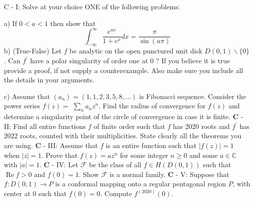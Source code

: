 \documentclass[14pt]{extarticle}
\begin{document}
\newpage
C - I: Solve at your choice ONE of the following problems:

a) If $0<a<1$ then show that
$$
\int_{-\infty}^{\infty} \frac{e^{a x}}{1+e^{x}} d x=\frac{\pi}{\sin (a \pi)}
$$
b) (True-False) Let $f$ be analytic on the open punctured unit disk $D(0,1) \backslash\{0\}$. Can $f^{\prime}$ have a polar singularity of order one at 0 ? If you believe it is true provide a proof, if not supply a counterexample. Also make sure you include all the details in your arguments.

c) Assume that $\left(a_{n}\right)=(1,1,2,3,5,8, \ldots)$ is Fibonacci sequence. Consider the power series $f(z)=$ $\sum_{n} a_{n} z^{n}$. Find the radius of convergence for $f(z)$ and determine a singularity point of the circle of convergence in case it is finite.
\newpage
$\mathbf{C}$ - II: Find all entire functions $f$ of finite order such that $f$ has 2020 roots and $f^{\prime}$ has 2022 roots, counted with their multiplicities. State clearly all the theorems you are using.
\newpage
$\mathbf{C}$ - III: Assume that $f$ is an entire function such that $|f(z)|=1$ when $|z|=1$. Prove that $f(z)=a z^{n}$ for some integer $n \geq 0$ and some $a \in \mathbb{C}$ with $|a|=1$.
\newpage
$\mathbf{C}$ - IV: Let $\mathcal{F}$ be the class of all $f \in H(D(0,1))$ such that $\operatorname{Re} f>0$ and $f(0)=1$. Show $\mathcal{F}$ is a normal family.
\newpage
$\mathbf{C}$ - V: Suppose that $f: D(0,1) \rightarrow P$ is a conformal mapping onto a regular pentagonal region $P$, with center at 0 such that $f(0)=0$. Compute $f^{(2020)}(0)$.
\end{document}
